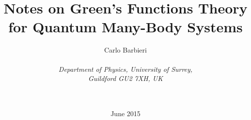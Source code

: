 \documentclass[12pt,a4paper,twoside]{report}
\begin{document}
\title{\sf Notes on Green's Functions Theory for Quantum Many-Body Systems}
\author{Carlo Barbieri\\
~ \\
{\em Department of Physics, University of Surrey,} \\
{\em Guildford GU2 7XH, UK} \\
 ~\\
 ~\\
 }
\date{June 2015}
\maketitle




\end{document}
